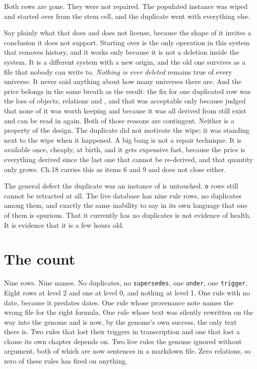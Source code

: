 Both rows are gone. They were not repaired. The populated instance was wiped and started over from the stem cell, and the duplicate went with everything else.

Say plainly what that does and does not license, because the shape of it invites a conclusion it does not support. Starting over is the only operation in this system that removes history, and it works only because it is not a deletion inside the system. It is a different system with a new origin, and the old one survives as a \labLineageSize{} file that nobody can write to. \emph{Nothing is ever deleted} remains true of every universe. It never said anything about how many universes there are. And the price belongs in the same breath as the result: the fix for one duplicated row was the loss of \labLineageObjects{} objects, \labLineageRelations{} relations and \labLineageScale, and that was acceptable only because \labPI{} judged that none of it was worth keeping and because \labLineageSource{} it was all derived from still exist and can be read in again. Both of those reasons are contingent. Neither is a property of the design. The duplicate did not motivate the wipe; it was standing next to the wipe when it happened. A big bang is not a repair technique. It is available once, cheaply, at birth, and it gets expensive fast, because the price is everything derived since the last one that cannot be re-derived, and that quantity only grows. Ch.18 carries this as items 6 and 9 and does not close either.

The general defect the duplicate was an instance of is untouched. \texttt{o} rows still cannot be retracted at all. The live database has nine rule rows, no duplicates among them, and exactly the same inability to say in its own language that one of them is spurious. That it currently has no duplicates is not evidence of health. It is evidence that it is a few hours old.

\section{The count}

Nine rows. Nine names. No duplicates, no \texttt{supersedes}, one \texttt{under}, one \texttt{trigger}. Eight rows at level 2 and one at level 0, and nothing at level 1. One rule with no date, because it predates dates. One rule whose provenance note names the wrong file for the right formula. One rule whose text was silently rewritten on the way into the genome and is now, by the genome's own success, the only text there is. Two rules that lost their triggers in transcription and one that lost a clause its own chapter depends on. Two live rules the genome ignored without argument, both of which are now sentences in a markdown file. Zero relations, so zero of these rules has fired on anything.

